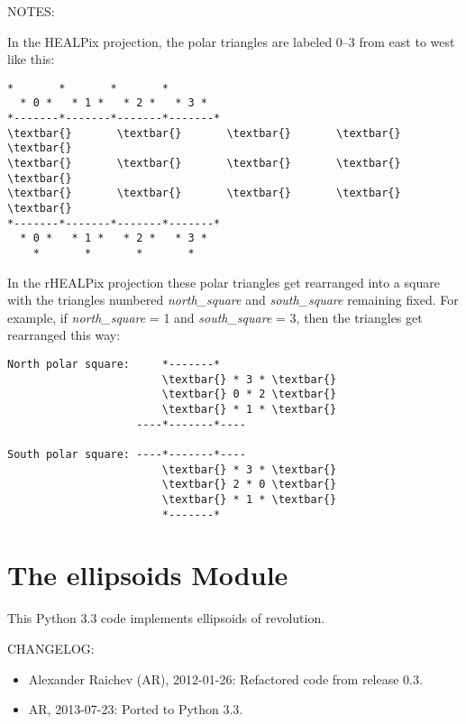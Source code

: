 \documentclass[a4paper,12ptopenany,oneside]{sphinxmanual}
\begin{document}
\begin{fulllineitems}
NOTES:

In the HEALPix projection, the polar triangles are labeled 0--3 from 
east to west like this:

\begin{Verbatim}[commandchars=\\\{\}]
    *       *       *       *       
  * 0 *   * 1 *   * 2 *   * 3 *        
*-------*-------*-------*-------*
\textbar{}       \textbar{}       \textbar{}       \textbar{}       \textbar{}
\textbar{}       \textbar{}       \textbar{}       \textbar{}       \textbar{}
\textbar{}       \textbar{}       \textbar{}       \textbar{}       \textbar{}
*-------*-------*-------*-------*
  * 0 *   * 1 *   * 2 *   * 3 *
    *       *       *       *
\end{Verbatim}

In the rHEALPix projection these polar triangles get rearranged
into a square with the triangles numbered \emph{north\_square} and \emph{south\_square} 
remaining fixed.
For example, if \emph{north\_square} = 1 and \emph{south\_square} = 3, 
then the triangles get rearranged this way:

\begin{Verbatim}[commandchars=\\\{\}]
North polar square:     *-------*       
                        \textbar{} * 3 * \textbar{}    
                        \textbar{} 0 * 2 \textbar{}    
                        \textbar{} * 1 * \textbar{}    
                    ----*-------*----
                    
South polar square: ----*-------*----
                        \textbar{} * 3 * \textbar{}
                        \textbar{} 2 * 0 \textbar{}
                        \textbar{} * 1 * \textbar{}
                        *-------*
\end{Verbatim}

\end{fulllineitems}



\chapter{The ellipsoids Module}
\label{ellipsoids::doc}\label{ellipsoids:the-ellipsoids-module}\label{ellipsoids:module-rhealpix_dggs.ellipsoids}
This Python 3.3 code implements ellipsoids of revolution.

CHANGELOG:
\begin{itemize}
\item {} 
Alexander Raichev (AR), 2012-01-26: Refactored code from release 0.3.

\item {} 
AR, 2013-07-23: Ported to Python 3.3.

\end{itemize}
\end{document}
